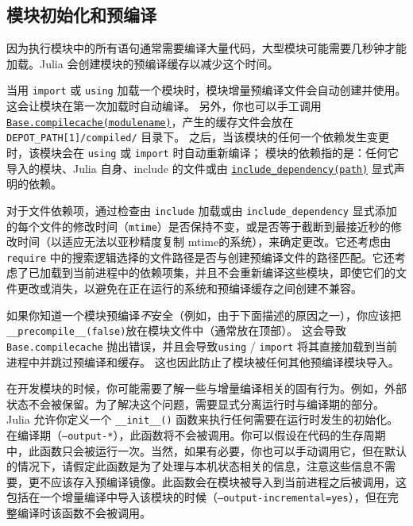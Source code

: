 \hypertarget{10308651053456408379}{}


\subsection{模块初始化和预编译}



因为执行模块中的所有语句通常需要编译大量代码，大型模块可能需要几秒钟才能加载。Julia 会创建模块的预编译缓存以减少这个时间。



当用 \texttt{import} 或 \texttt{using} 加载一个模块时，模块增量预编译文件会自动创建并使用。这会让模块在第一次加载时自动编译。 另外，你也可以手工调用 \hyperlink{15403934372637978246}{\texttt{Base.compilecache(modulename)}}，产生的缓存文件会放在 \texttt{DEPOT\_PATH[1]/compiled/} 目录下。 之后，当该模块的任何一个依赖发生变更时，该模块会在 \texttt{using} 或 \texttt{import} 时自动重新编译； 模块的依赖指的是：任何它导入的模块、Julia 自身、include 的文件或由 \hyperlink{13423629850785876688}{\texttt{include\_dependency(path)}} 显式声明的依赖。



对于文件依赖项，通过检查由 \texttt{include} 加载或由 \texttt{include\_dependency} 显式添加的每个文件的修改时间（\texttt{mtime}）是否保持不变，或是否等于截断到最接近秒的修改时间（以适应无法以亚秒精度复制 mtime的系统），来确定更改。它还考虑由 \texttt{require} 中的搜索逻辑选择的文件路径是否与创建预编译文件的路径匹配。它还考虑了已加载到当前进程中的依赖项集，并且不会重新编译这些模块，即使它们的文件更改或消失，以避免在正在运行的系统和预编译缓存之间创建不兼容。



如果你知道一个模块预编译\emph{不}安全（例如，由于下面描述的原因之一），你应该把\texttt{\_\_precompile\_\_(false)}放在模块文件中（通常放在顶部）。 这会导致\texttt{Base.compilecache} 抛出错误，并且会导致\texttt{using} / \texttt{import} 将其直接加载到当前进程中并跳过预编译和缓存。 这也因此防止了模块被任何其他预编译模块导入。



在开发模块的时候，你可能需要了解一些与增量编译相关的固有行为。例如，外部状态不会被保留。为了解决这个问题，需要显式分离运行时与编译期的部分。Julia 允许你定义一个 \texttt{\_\_init\_\_()} 函数来执行任何需要在运行时发生的初始化。在编译期（\texttt{--output-*}），此函数将不会被调用。你可以假设在代码的生存周期中，此函数只会被运行一次。当然，如果有必要，你也可以手动调用它，但在默认的情况下，请假定此函数是为了处理与本机状态相关的信息，注意这些信息不需要，更不应该存入预编译镜像。此函数会在模块被导入到当前进程之后被调用，这包括在一个增量编译中导入该模块的时候（\texttt{--output-incremental=yes}），但在完整编译时该函数不会被调用。



